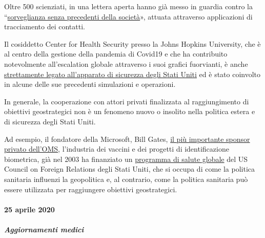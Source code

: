 Oltre 500 scienziati, in una lettera aperta hanno già messo in guardia
contro la
``\href{https://www.esat.kuleuven.be/cosic/sites/contact-tracing-joint-statement/}{sorveglianza
senza precedenti della società}», attuata attraverso applicazioni di
tracciamento dei contatti.

Il cosiddetto Center for Health Security presso la Johns Hopkins
University, che è al centro della gestione della pandemia di Covid19 e
che ha contribuito notevolmente all'escalation globale attraverso i suoi
grafici fuorvianti, è anche
\href{http://unlimitedhangout.com/2020/04/investigative-series/all-roads-lead-to-dark-winter/}{strettamente
legato all'apparato di sicurezza degli Stati Uniti} ed è stato coinvolto
in alcune delle sue precedenti simulazioni e operazioni.

In generale, la cooperazione con attori privati finalizzata al
raggiungimento di obiettivi geostrategici non è un fenomeno nuovo o
insolito nella politica estera e di sicurezza degli Stati Uniti.

Ad esempio, il fondatore della Microsoft, Bill Gates,
\href{https://www.youtube.com/watch?v=wQSYdAX_9JY}{il più importante
sponsor privato dell'OMS}, l'industria dei vaccini e dei progetti di
identificazione biometrica, già nel 2003 ha finanziato un
\href{https://www.cfr.org/news-releases/council-establishes-senior-fellowship-global-health-and-foreign-policy-grant-bill}{programma
di salute globale} del US Council on Foreign Relations degli Stati
Uniti, che si occupa di come la politica sanitaria influenzi la
geopolitica e, al contrario, come la politica sanitaria può essere
utilizzata per raggiungere obiettivi geostrategici.

\hypertarget{25-aprile-2020-1}{%
\paragraph{25 aprile 2020}\label{25-aprile-2020-1}}

\hypertarget{aggiornamenti-medici-1}{%
\subparagraph{\texorpdfstring{\textbf{Aggiornamenti
medici}}{Aggiornamenti medici}}\label{aggiornamenti-medici-1}}

